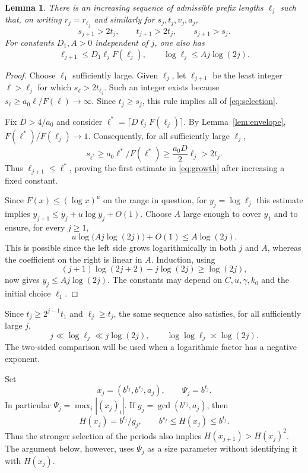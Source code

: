 \documentclass[11pt]{article}
\numberwithin{equation}{section}
\newtheorem{lemma}[theorem]{Lemma}
\theoremstyle{remark}
\begin{document}
\begin{lemma}\label{lem:selection}
There is an increasing sequence of admissible prefix lengths $\ell_j$
such that, on writing $r_j=r_{\ell_j}$ and similarly for $s_j,t_j,v_j,a_j$,
\begin{equation}\label{eq:selection}
 s_{j+1}>2t_j,\qquad t_{j+1}>2t_j,\qquad s_{j+1}>s_j.
\end{equation}
For constants $D_1,A>0$ independent of $j$, one also has
\begin{equation}\label{eq:growth}
 \ell_{j+1}\le D_1\ell_jF(\ell_j),\qquad
 \log\ell_j\le Aj\log(2j).
\end{equation}
\end{lemma}
\begin{proof}
Choose $\ell_1$ sufficiently large. Given $\ell_j$, let $\ell_{j+1}$
be the least integer $\ell>\ell_j$ for which $s_\ell>2t_{\ell_j}$.
Such an integer exists because
$s_\ell\ge a_0\ell/F(\ell)\to\infty$.
Since $t_j\ge s_j$, this rule implies all of \eqref{eq:selection}.

Fix $D>4/a_0$ and consider
$\ell^*=\lceil D\ell_jF(\ell_j)\rceil$.
By Lemma~\ref{lem:envelope}, $F(\ell^*)/F(\ell_j)\to1$.
Consequently, for all sufficiently large $\ell_j$,
\[
 s_{\ell^*}
 \ge a_0\ell^*/F(\ell^*)
 \ge \frac{a_0D}{2}\ell_j
 >2t_j.
\]
Thus $\ell_{j+1}\le\ell^*$, proving the first estimate in
\eqref{eq:growth} after increasing a fixed constant.

Since $F(x)\le(\log x)^u$ on the range in question, for
$y_j=\log\ell_j$ this estimate implies
$y_{j+1}\le y_j+u\log y_j+O(1)$.
Choose $A$ large enough to cover $y_1$ and to ensure, for every $j\ge1$,
\[
 u\log\bigl(Aj\log(2j)\bigr)+O(1)\le A\log(2j).
\]
This is possible since the left side grows logarithmically in both
$j$ and $A$, whereas the coefficient on the right is linear in $A$.
Induction, using
\[
 (j+1)\log(2j+2)-j\log(2j)\ge\log(2j),
\]
now gives $y_j\le Aj\log(2j)$.
The constants may depend on $C,u,\gamma,k_0$ and the initial choice $\ell_1$.
\end{proof}

Since $t_j\ge2^{j-1}t_1$ and $\ell_j\ge t_j$, the same sequence also
satisfies, for all sufficiently large $j$,
\begin{equation}\label{eq:loggrowth}
 j\ll\log\ell_j\ll j\log(2j),\qquad
 \log\log\ell_j\asymp\log(2j).
\end{equation}
The two-sided comparison will be used when a logarithmic factor has
a negative exponent.

Set
\begin{equation}\label{eq:points}
 x_j=(b^{t_j},b^{r_j},a_j),\qquad \Psi_j=b^{t_j}.
\end{equation}
In particular $\Psi_j=\max_i|(x_j)_i|$. If
$g_j=\gcd(b^{r_j},a_j)$, then
\begin{equation}\label{eq:ordinaryheight}
 H(x_j)=b^{t_j}/g_j,\qquad
 b^{s_j}\le H(x_j)\le b^{t_j}.
\end{equation}
Thus the stronger selection of the periods also implies
$H(x_{j+1})>H(x_j)^2$. The argument below, however, uses $\Psi_j$
as a size parameter without identifying it with $H(x_j)$.
\end{document}
